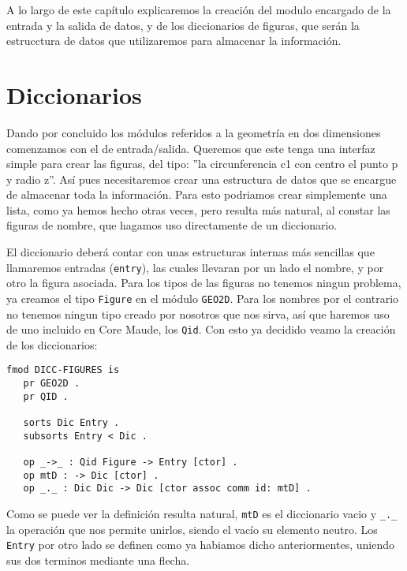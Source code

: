 
A lo largo de este capítulo explicaremos la creación del modulo encargado de la entrada y la salida de datos, y de los diccionarios de figuras, que serán la estrucctura de datos que utilizaremos para almacenar la información.\par

\section{Diccionarios}

Dando por concluido los módulos referidos a la geometría en dos dimensiones comenzamos con el de entrada/salida. Queremos que este tenga una interfaz simple para crear las figuras, del tipo: ''la circunferencia c1 con centro el punto p y radio z''. Así pues necesitaremos crear una estructura de datos que se encargue de almacenar toda la información. Para esto podriamos crear simplemente una lista, como ya hemos hecho otras veces, pero resulta más natural, al constar las figuras de nombre, que hagamos uso directamente de un diccionario. \par

El diccionario deberá contar con unas estructuras internas más sencillas que llamaremos entradas (\texttt{entry}), las cuales llevaran por un lado el nombre, y por otro la figura asociada. Para los tipos de las figuras no tenemos ningun problema, ya creamos el tipo \texttt{Figure} en el módulo \texttt{GEO2D}. Para los nombres por el contrario no tenemos ningun tipo creado por nosotros que nos sirva, así que haremos uso de uno incluido en Core Maude, los \texttt{Qid}. Con esto ya decidido veamo la creación de los diccionarios:\par

{\codesize
\begin{verbatim}
fmod DICC-FIGURES is
   pr GEO2D .
   pr QID .

   sorts Dic Entry .
   subsorts Entry < Dic .

   op _->_ : Qid Figure -> Entry [ctor] .
   op mtD : -> Dic [ctor] .
   op _._ : Dic Dic -> Dic [ctor assoc comm id: mtD] .

\end{verbatim}
}

Como se puede ver la definición resulta natural, \texttt{mtD} es el diccionario vacio y \verb"_._" la operación que nos permite unirlos, siendo el vacío su elemento neutro. Los \texttt{Entry} por otro lado se definen como ya habiamos dicho anteriormentes, uniendo sus dos terminos mediante una flecha.\par

